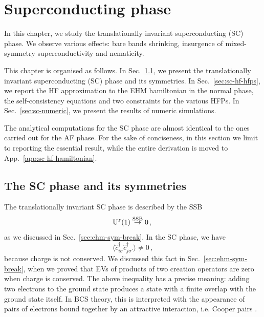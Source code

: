 \def\GraphicsFolder{chapters/superconducting-instability/pictures}
\chapter{Superconducting phase}\label{chap:sc}

In this chapter, we study the translationally invariant superconducting (SC) phase. We observe various effects: bare bands shrinking, insurgence of mixed-symmetry superconductivity and nematicity.

This chapter is organised as follows. In Sec.~\ref{sec:sc-phase-theory}, we present the translationally invariant superconducting (SC) phase and its symmetries. In Sec.~\ref{sec:sc-hf-hfps}, we report the HF approximation to the EHM hamiltonian in the normal phase, the self-consistency equations and two constraints for the various HFPs.
In Sec.~\ref{sec:sc-numeric}, we present the results of numeric simulations.

The analytical computations for the SC phase are almost identical to the ones carried out for the AF phase. For the sake of conciseness, in this section we limit to reporting the essential result, while the entire derivation is moved to App.~\ref{app:sc-hf-hamiltonian}.

\section{The SC phase and its symmetries}\label{sec:sc-phase-theory}

The translationally invariant SC phase is described by the SSB
\[
	\mathrm{U}^z(1) \stackrel{\mathrm{SSB}}{\to} 0 \, , \\
\]
as we discussed in Sec.~\ref{sec:ehm-sym-break}. In the SC phase, we have
\[
	\big\langle
	\hat c_{i\sigma}^\dagger \hat c_{j\sigma'}^\dagger \rangle \neq 0 \, ,
\]
because charge is not conserved. We discussed this fact in Sec.~\ref{sec:ehm-sym-break}, when we proved that EVs of products of two creation operators are zero when charge is conserved. The above inequality has a precise meaning: adding two electrons to the ground state produces a state with a finite overlap with the ground state itself. In BCS theory, this is interpreted with the appearance of pairs of electrons bound together by an attractive interaction, i.e. Cooper pairs \cite{grosso2014solid,coleman2015introduction}.

